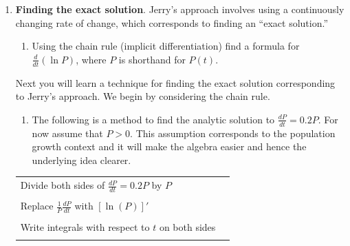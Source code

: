 \begin{enumerate}[resume]
\item	\textbf{Finding the exact solution}. Jerry's approach involves using a continuously changing rate of change, which corresponds to finding an ``exact solution.'' \label{05problem2}
\begin{enumerate}


\item Using the chain rule (implicit differentiation) find a formula for $\frac{d}{dt} \left( \ln{P} \right)$, where $P$ is shorthand for $P(t)$. \label{05problem2partb}
\end{enumerate}
\vfill


Next you will learn a technique for finding the exact solution corresponding to Jerry's approach. We begin by considering the chain rule.

\begin{enumerate}[resume]
\item	 The following is a method to find the analytic solution to $\displaystyle\frac{dP}{dt}= 0.2P$. For now assume that $P > 0$. This assumption corresponds to the population growth context and it will make the algebra easier and hence the underlying idea clearer.  \label{05problem2partc}
 
\end{enumerate}

\begin{center} \renewcommand{\arraystretch}{1.5}
\begin{tabular}{|p{2in}|V|}
\hline

Divide both sides of \newline $\frac{dP}{dt}=0.2P$ by $P$ &
{} \\
{} & {} \\
\hline

Replace $\frac{1}{P}\frac{dP}{dt}$ with $\left[ \ln(P)\right]'$ & 
{} \\
{} & {} \\
\hline
	 
Write integrals with respect to $t$ on both sides & 
\\{} & {} \\ 
\hline
	 

\end{tabular}
\end{center}
\end{enumerate}
